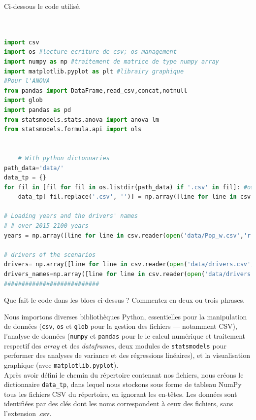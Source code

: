 \documentclass[a4,11pt]{aleph-notas}
\newcommand{\ans}[1]{
\begin{mdframed}[
    roundcorner=10pt,     %
    backgroundcolor=gray!20, %
    linecolor=black,      %
    linewidth=1pt,        %
    innertopmargin=10pt,  %
    innerbottommargin=10pt, %
    innerleftmargin=10pt,  %
    innerrightmargin=10pt  %
]
#1
\end{mdframed}
}
\begin{document}
Ci-dessous le code utilisé.

\begin{lstlisting}[language=Python]


import csv
import os #lecture ecriture de csv; os management
import numpy as np #traitement de matrice de type numpy array
import matplotlib.pyplot as plt #librairy graphique
#Pour l'ANOVA
from pandas import DataFrame,read_csv,concat,notnull
import glob
import pandas as pd
from statsmodels.stats.anova import anova_lm
from statsmodels.formula.api import ols


    # With python dictonnaries
path_data='data/'
data_tp = {}
for fil in [fil for fil in os.listdir(path_data) if '.csv' in fil]: #os.listdir(path_data) renvoie tous les fichiers dans path_data et on ne garde que les .csv
    data_tp[ fil.replace('.csv', '')] = np.array([line for line in csv.reader(open( path_data+fil,'r'))][1:],dtype=float)

# Loading years and the drivers' names
# # over 2015-2100 years
years = np.array([line for line in csv.reader(open('data/Pop_w.csv','r'))][0],dtype=float) #line zero zero

# drivers of the scenarios
drivers= np.array([line for line in csv.reader(open('data/drivers.csv','r'))][1:],dtype=float)#values of the alternative groups of parameters
drivers_names=np.array([line for line in csv.reader(open('data/drivers.csv','r'))][0],dtype=str)#names of the groups of parameters
###########################

\end{lstlisting}
\ans{Que fait le code dans les blocs ci-dessus ? Commentez en deux ou trois phrases. }

Nous importons diverses bibliothèques Python, essentielles pour la manipulation de données (\texttt{csv}, \texttt{os} et \texttt{glob} pour la gestion des fichiers — notamment CSV), l'analyse de données (\texttt{numpy} et \texttt{pandas} pour le le calcul numérique et traitement respectif des \textit{array} et des \textit{dataframes}, deux modules de \texttt{statsmodels} pour performer des analyses de variance et des régressions linéaires), et la visualisation graphique (avec \texttt{matplotlib.pyplot}). \\

Après avoir défini le chemin du répertoire contenant nos fichiers, nous créons le dictionnaire \texttt{data\_tp}, dans lequel nous stockons sous forme de tableau NumPy tous les fichiers CSV du répertoire, en ignorant les en-têtes. Les données sont identifiées par des clés dont les noms correspondent à ceux des fichiers, sans l'extension .csv. \\
\end{document}
